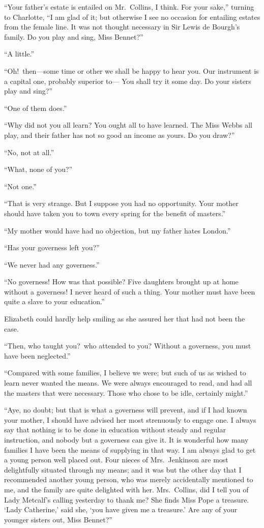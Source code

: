 \documentclass[12pt,english,oneside]{book}
\begin{document}
{}``Your father's estate is entailed on Mr.\ Collins, I think. For
your sake,'' turning to Charlotte, {}``I am glad of it; but otherwise
I see no occasion for entailing estates from the female line. It was
not thought necessary in Sir Lewis de Bourgh's family. Do you play
and sing, Miss Bennet?''\ 

{}``A little.''

{}``Oh!\ then\mbox{---}some time or other we shall be happy to
hear you. Our instrument is a capital one, probably superior to\mbox{---}
You shall try it some day. Do your sisters play and sing?''\ 

{}``One of them does.''

{}``Why did not you all learn? You ought all to have learned. The
Miss Webbs all play, and their father has not so good an income as
yours. Do you draw?''\ 

{}``No, not at all.''

{}``What, none of you?''\ 

{}``Not one.''

{}``That is very strange. But I suppose you had no opportunity. Your
mother should have taken you to town every spring for the benefit
of masters.''

{}``My mother would have had no objection, but my father hates London.''

{}``Has your governess left you?''\ 

{}``We never had any governess.''

{}``No governess! How was that possible? Five daughters brought up
at home without a governess! I never heard of such a thing. Your mother
must have been quite a slave to your education.''

Elizabeth could hardly help smiling as she assured her that had not
been the case.

{}``Then, who taught you?\ who attended to you? Without a governess,
you must have been neglected.''

{}``Compared with some families, I believe we were; but such of us
as wished to learn never wanted the means. We were always encouraged
to read, and had all the masters that were necessary. Those who chose
to be idle, certainly might.''

{}``Aye, no doubt; but that is what a governess will prevent, and
if I had known your mother, I should have advised her most strenuously
to engage one. I always say that nothing is to be done in education
without steady and regular instruction, and nobody but a governess
can give it. It is wonderful how many families I have been the means
of supplying in that way. I am always glad to get a young person well
placed out. Four nieces of Mrs.\ Jenkinson are most delightfully
situated through my means; and it was but the other day that I recommended
another young person, who was merely accidentally mentioned to me,
and the family are quite delighted with her. Mrs.\ Collins, did I
tell you of Lady Metcalf's calling yesterday to thank me? She finds
Miss Pope a treasure. `Lady Catherine,' said she, `you have given
me a treasure.' Are any of your younger sisters out, Miss Bennet?''\ 
\end{document}
